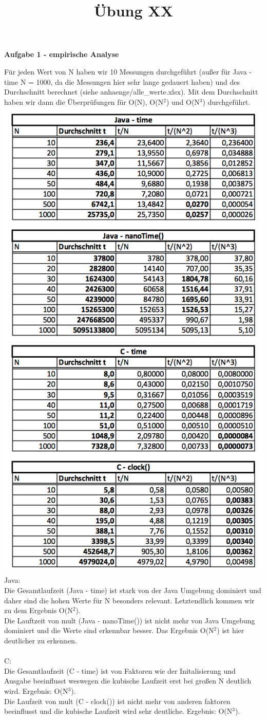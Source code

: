 \documentclass[a4paper,11pt]{scrartcl}
\title{Übung XX}
\begin{document}
\begin{center}
\LARGE{\textbf{Aufgabe 1 - empirische Analyse}}
\end{center}
Für jeden Wert von N haben wir 10 Messungen durchgeführt (außer für Java - time N = 1000, da die Messungen hier sehr lange gedauert haben) und des Durchschnitt berechnet (siehe anhaenge/alle\_werte.xlsx). Mit dem Durchschnitt haben wir dann die Überprüfungen für O(N), O(N$^2$) und O(N$^3$) durchgeführt. 
\includegraphics[width=.51\textwidth]{empirischer_test.png}\\
Java:\\
Die Gesamtlaufzeit (Java - time) ist stark von der Java Umgebung dominiert und daher sind die hohen Werte für N besonders relevant. Letztendlich kommen wir zu dem Ergebnis O(N$^2$).\\
Die Lauftzeit von mult (Java - nanoTime()) ist nicht mehr von Java Umgebung dominiert und die Werte sind erkennbar besser. Das Ergebnis O(N$^2$) ist hier deutlicher zu erkennen.\\\\
C:\\
Die Gesamtlaufzeit (C - time) ist von Faktoren wie der Initalisierung und Ausgabe beeinflusst weswegen die kubische Laufzeit erst bei großen N deutlich wird. Ergebnis: O(N$^3$).\\
Die Laufzeit von mult (C - clock()) ist nicht mehr von anderen faktoren beeinflusst und die kubische Laufzeit wird sehr deutliche. Ergebnis: O(N$^3$).
\end{document}
